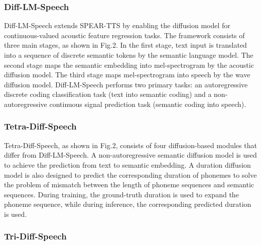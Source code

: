 \documentclass{article}
\begin{document}
\subsubsection{Diff-LM-Speech}
Diff-LM-Speech extends SPEAR-TTS\cite{zhang2023speak} by enabling the diffusion model for continuous-valued acoustic feature regression tasks. The framework consists of three main stages, as shown in Fig.2. In the first stage, text input is translated into a sequence of discrete semantic tokens by the semantic language model. The second stage maps the semantic embedding into mel-spectrogram by the acoustic diffusion model. The third stage maps mel-spectrogram into speech by the wave diffusion model. Diff-LM-Speech performs two primary tasks: an autoregressive discrete coding classification task (text into semantic coding) and a non-autoregressive continuous signal prediction task (semantic coding into speech).

\subsubsection{Tetra-Diff-Speech}

Tetra-Diff-Speech, as shown in Fig.2, consists of four diffusion-based modules that differ from Diff-LM-Speech. A non-autoregressive semantic diffusion model is used to achieve the prediction from text to semantic embedding. A duration diffusion model is also designed to predict the corresponding duration of phonemes to solve the problem of mismatch between the length of phoneme sequences and semantic sequences. During training, the ground-truth duration is used to expand the phoneme sequence, while during inference, the corresponding predicted duration is used.


\subsubsection{Tri-Diff-Speech}
\end{document}
